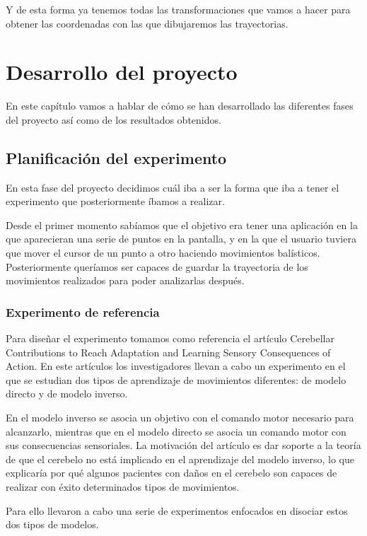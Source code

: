 \documentclass[a4paper,11pt, oneside]{book}
\begin{document}
Y de esta forma ya tenemos todas las transformaciones que vamos a hacer para obtener las coordenadas con las que dibujaremos las trayectorias.


\chapter{Desarrollo del proyecto}




En este capítulo vamos a hablar de cómo se han desarrollado las diferentes fases del proyecto así como de los resultados obtenidos.

\section{Planificación del experimento}

En esta fase del proyecto decidimos cuál iba a ser la forma que iba a tener el experimento que posteriormente íbamos a realizar.

Desde el primer momento sabíamos que el objetivo era tener una aplicación en la que aparecieran una serie de puntos en la pantalla, y en la que el usuario tuviera que mover el cursor de un punto a otro haciendo movimientos balísticos. Posteriormente queríamos ser capaces de guardar la trayectoria de los movimientos realizados para poder analizarlas después.

\subsection{Experimento de referencia}
Para diseñar el experimento tomamos como referencia el artículo Cerebellar Contributions to Reach Adaptation and Learning Sensory Consequences of Action. En este artículos los investigadores llevan a cabo un experimento en el que se estudian dos tipos de aprendizaje de movimientos diferentes:  de modelo directo y de modelo inverso.

En el modelo inverso se asocia un objetivo con el comando motor necesario para alcanzarlo, mientras que en el modelo directo se asocia un comando motor con sus consecuencias sensoriales. La motivación del artículo es dar soporte a la teoría de que el cerebelo no está implicado en el aprendizaje del modelo inverso, lo que explicaría por qué algunos pacientes con daños en el cerebelo son capaces de realizar con éxito determinados tipos de movimientos.

Para ello llevaron a cabo una serie de experimentos enfocados en disociar estos dos tipos de modelos. 
\end{document}
